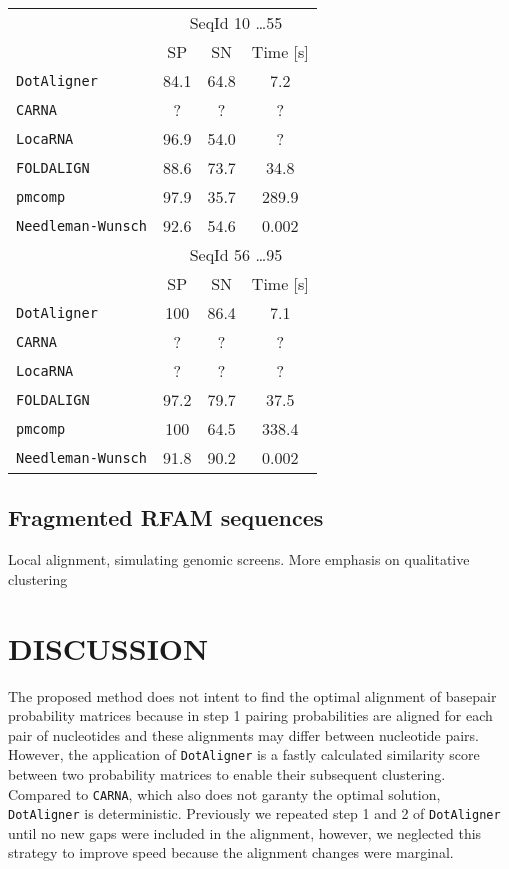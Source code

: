 \documentclass[a4paper,twoside]{article}
\newcommand\dotaligner{\texttt{DotAligner}}
\newcommand\pmcomp{\texttt{pmcomp}}
\newcommand\locarna{\texttt{LocaRNA}}
\newcommand\foldalign{\texttt{FOLDALIGN}}
\newcommand\carna{\texttt{CARNA}}
\newcommand\nw{\texttt{Needleman-Wunsch}}
\begin{document}
\begin{tabular}{|l|c|c|c|}
\hline 
 & \multicolumn{3}{c|}{SeqId 10 \ldots 55} \\
 & SP & SN & Time [s] \\ 
\hline 
\dotaligner & 84.1 & 64.8 & 7.2 \\ 
\carna & ? & ? & ? \\ 
\locarna & 96.9 & 54.0 & ? \\ 
\foldalign & 88.6 & 73.7 & 34.8 \\ 
\pmcomp & 97.9 & 35.7 & 289.9 \\ 
\nw & 92.6 & 54.6 & 0.002 \\
\hline 
\hline 
 & \multicolumn{3}{c|}{SeqId 56 \ldots 95} \\
 & SP & SN & Time [s] \\ 
\dotaligner & 100 & 86.4 & 7.1 \\ 
\carna & ? & ? & ? \\ 
\locarna & ? & ? & ? \\ 
\foldalign & 97.2 & 79.7 & 37.5 \\ 
\pmcomp & 100 & 64.5 & 338.4 \\ 
\nw & 91.8 & 90.2 & 0.002 \\
\hline 
\end{tabular} 


\subsection{Fragmented RFAM sequences} 

Local alignment, simulating genomic screens. More emphasis on qualitative clustering



\section{\uppercase{Discussion}}

\noindent The proposed method does not intent to find the optimal alignment of
basepair probability matrices because in step 1 pairing probabilities are
aligned for each pair of nucleotides  and these alignments may differ between
nucleotide pairs. However, the application of \dotaligner{} is a fastly
calculated similarity score between two probability matrices to enable their
subsequent clustering.  Compared to \carna{}, which also does not garanty the
optimal solution, \dotaligner{} is deterministic. Previously we repeated step 1
and 2 of \dotaligner{} until no new gaps were included in the alignment,
however, we neglected this strategy to improve speed because the alignment
changes were marginal.
\end{document}
